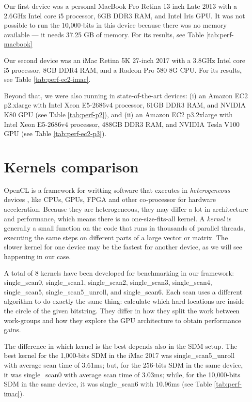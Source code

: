 Our first device was a personal MacBook Pro Retina 13-inch Late 2013 with a 2.6GHz Intel core i5 processor, 6GB DDR3 RAM, and Intel Iris GPU. It was not possible to run the 10,000-bits in this device because there was no memory available --- it needs 37.25 GB of memory. For its results, see Table \ref{tab:perf-macbook}

Our second device was an iMac Retina 5K 27-inch 2017 with a 3.8GHz Intel core i5 processor, 8GB DDR4 RAM, and a Radeon Pro 580 8G CPU. For its results, see Table \ref{tab:perf-ec2-imac}.

Beyond that, we were also running in state-of-the-art devices: (i) an Amazon EC2 p2.xlarge with Intel Xeon E5-2686v4 processor, 61GB DDR3 RAM, and NVIDIA K80 GPU (see Table \ref{tab:perf-p2}), and (ii) an Amazon EC2 p3.2xlarge with Intel Xeon E5-2686v4 processor, 488GB DDR3 RAM, and NVIDIA Tesla V100 GPU (see Table \ref{tab:perf-ec2-p3}).


\section{Kernels comparison}

OpenCL is a framework for writting software that executes in \emph{heterogeneous} devices \citep{munshi2009opencl}, like CPUs, GPUs, FPGA and other co-processor for hardware acceleration. Because they are heterogeneous, they may differ a lot in architecture and performance, which means there is no one-size-fits-all kernel. A \emph{kernel} is generally a small function on the code that runs in thousands of parallel threads, executing the same steps on different parts of a large vector or matrix. The slower kernel for one device may be the fastest for another device, as we will see happening in our case.

A total of 8 kernels have been developed for benchmarking in our framework: single\_scan0, single\_scan1, single\_scan2, single\_scan3, single\_scan4, single\_scan5, single\_scan5\_unroll, and single\_scan6. Each scan uses a different algorithm to do exactly the same thing: calculate which hard locations are inside the circle of the given bitstring. They differ in how they split the work between work-groups and how they explore the GPU architecture to obtain performance gains.

The difference in which kernel is the best depends also in the SDM setup. The best kernel for the 1,000-bits SDM in the iMac 2017 was single\_scan5\_unroll with average scan time of 3.61ms; but, for the 256-bits SDM in the same device, it was single\_scan0 with average scan time of 3.03ms; while, for the 10,000-bits SDM in the same device, it was single\_scan6 with 10.96ms (see Table \ref{tab:perf-imac}).

